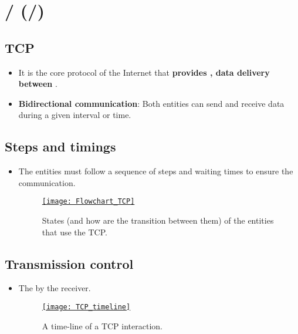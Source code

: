 \chapter{/ (/)}

\section{\gls{TCP}}
\begin{itemize}
\item It is the core protocol of the Internet that \textbf{provides
  , data delivery between
  }
  \cite{wikipedia_TCP}.
\item \textbf{Bidirectional communication}: Both entities can send and receive
  data during a given interval or time.
\end{itemize}

\section{Steps and timings}
\begin{itemize} 
\item The entities must follow a sequence of steps and waiting times to ensure the communication.
\begin{figure}[H]
  \vspace{-0ex}
  \centering
  \href{https://www.ibm.com/support/pages/flowchart-tcp-connections-and-their-definition}{\texttt{[image: Flowchart\_TCP]}}
  \caption{States (and how are the transition between them) of the
    entities that use the \gls{TCP}.}
  \label{fig:TCP_states}
\end{figure}
\end{itemize}


\section{Transmission control}
\begin{itemize} 
\item The  by the receiver.
\begin{figure}[H]
  \vspace{-0ex}
  \centering
  \href{https://ieeexplore.ieee.org/document/8668433}{\texttt{[image: TCP\_timeline]}}
  \caption{A time-line of a \gls{TCP} interaction.}
  \label{fig:TCP_interaction}
\end{figure}
\end{itemize}

